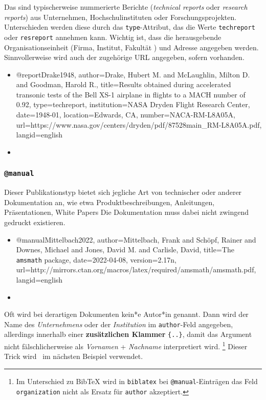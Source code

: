Das sind typischerweise nummerierte Berichte (\emph{technical reports} oder
\emph{research reports}) aus Unternehmen, Hochschulinstituten oder
Forschungsprojekten. Unterschieden werden diese durch das
\texttt{type}-Attribut, das die Werte \texttt{techreport} oder
\texttt{resreport} annehmen kann. Wichtig ist, dass die herausgebende
Organisationseinheit (Firma, Institut, Fakultät \etc) und Adresse angegeben
werden. Sinnvollerweise wird auch der zugehörige URL angegeben, sofern
vorhanden.
%
\begin{itemize}
\item[]
\begin{GenericCode}[numbers=none]
@report{Drake1948,
  author={Drake, Hubert M. and McLaughlin, Milton D. and Goodman, Harold R.},
  title={Results obtained during accelerated transonic tests of the {Bell} {XS-1} airplane in flights to a {MACH} number of 0.92},
  type={techreport},
  institution={NASA Dryden Flight Research Center},
  date={1948-01},
  location={Edwards, CA},
  number={NACA-RM-L8A05A},
  url={https://www.nasa.gov/centers/dryden/pdf/87528main_RM-L8A05A.pdf},
  langid={english}
}
\end{GenericCode}
\item[\cite{Drake1948}] 
\end{itemize}


\subsubsection{\texttt{\bfseries @manual}}
\label{sec:@manual}

Dieser Publikationstyp bietet sich jegliche Art von technischer oder anderer
Dokumentation an, wie etwa Produktbeschreibungen, Anleitungen,
Präsentationen, White Papers \usw Die Dokumentation muss dabei nicht zwingend
gedruckt existieren.
%
\begin{itemize}
\item[]
\begin{GenericCode}[numbers=none]
@manual{Mittelbach2022,
  author={Mittelbach, Frank and Schöpf, Rainer and Downes, Michael and Jones, David M. and Carlisle, David},
  title={The \texttt{amsmath} package},
  date={2022-04-08},
  version={2.17n},
  url={http://mirrors.ctan.org/macros/latex/required/amsmath/amsmath.pdf},
  langid={english}
}
\end{GenericCode}
\item[\cite{Mittelbach2022}] 
\end{itemize}
%
Oft wird bei derartigen Dokumenten kein*e Autor*in genannt. Dann wird der
Name des \emph{Unternehmens} oder der \emph{Institution} im
\texttt{author}-Feld angegeben, allerdings innerhalb einer
\textbf{zusätzlichen Klammer} \texttt{\{..\}}, damit das Argument nicht
fälschlicherweise als \emph{Vornamen} + \emph{Nachname} interpretiert wird.%
\footnote{Im Unterschied zu BibTeX wird in \texttt{biblatex} bei
\texttt{@manual}-Einträgen das Feld \texttt{organization} nicht als Ersatz
für \texttt{author} akzeptiert.} Dieser Trick wird \ua\ im nächsten Beispiel
verwendet.


